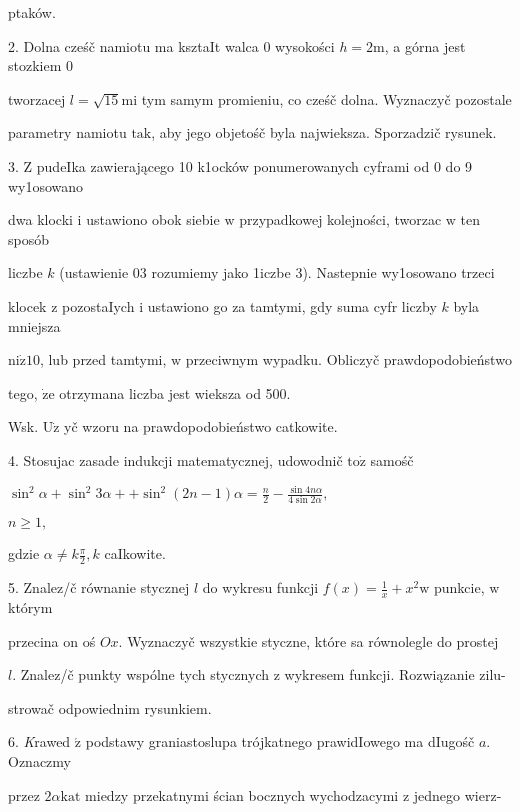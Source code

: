 \documentclass[a4paper,12pt]{article}
\begin{document}
ptaków.

2. Dolna cześč namiotu ma ksztaIt walca $0$ wysokości $h=2\mathrm{m}$, a górna jest stozkiem $0$

tworzacej $l=\sqrt{15}\mathrm{m}\mathrm{i}$ tym samym promieniu, co cześč dolna. Wyznaczyč pozostale

parametry namiotu $\mathrm{t}\mathrm{a}\mathrm{k}$, aby jego objetośč byla najwieksza. Sporzadzič rysunek.

3. $\mathrm{Z}$ pudeIka zawierającego 10 k1ocków ponumerowanych cyframi od 0 do 9 wy1osowano

dwa klocki $\mathrm{i}$ ustawiono obok siebie $\mathrm{w}$ przypadkowej kolejności, tworzac $\mathrm{w}$ ten sposób

liczbe $k$ (ustawienie 03 rozumiemy jako 1iczbe 3). Nastepnie wy1osowano trzeci

klocek $\mathrm{z}$ pozostaIych $\mathrm{i}$ ustawiono go za tamtymi, gdy suma cyfr liczby $k$ byla mniejsza

$\mathrm{n}\mathrm{i}\dot{\mathrm{z}}10$, lub przed tamtymi, $\mathrm{w}$ przeciwnym wypadku. Obliczyč prawdopodobieństwo

tego, $\dot{\mathrm{z}}\mathrm{e}$ otrzymana liczba jest wieksza od 500.

Wsk. $\mathrm{U}\dot{\mathrm{z}}$ yč wzoru na prawdopodobieństwo catkowite.

4. Stosujac zasade indukcji matematycznej, udowodnič $\mathrm{t}\mathrm{o}\dot{\mathrm{z}}$ samośč

$\sin^{2}\alpha+\sin^{2}3\alpha+ +\displaystyle \sin^{2}(2n-1)\alpha=\frac{n}{2}-\frac{\sin 4n\alpha}{4\sin 2\alpha},$

$n\geq 1,$

gdzie $\displaystyle \alpha\neq k\frac{\pi}{2}, k$ caIkowite.

5. Znalez/č równanie stycznej $l$ do wykresu funkcji $f(x)=\displaystyle \frac{1}{x}+x^{2}\mathrm{w}$ punkcie, $\mathrm{w}$ którym

przecina on oś $Ox$. Wyznaczyč wszystkie styczne, które sa równolegle do prostej

$l$. Znalez/č punkty wspólne tych stycznych $\mathrm{z}$ wykresem funkcji. Rozwiązanie zilu-

strowač odpowiednim rysunkiem.

6. {\it K}rawed $\acute{\mathrm{z}}$ podstawy graniastoslupa trójkatnego prawidIowego ma dIugośč $a$. Oznaczmy

przez $ 2\alpha \mathrm{k}\mathrm{a}\mathrm{t}$ miedzy przekatnymi ścian bocznych wychodzacymi $\mathrm{z}$ jednego wierz-
\end{document}
